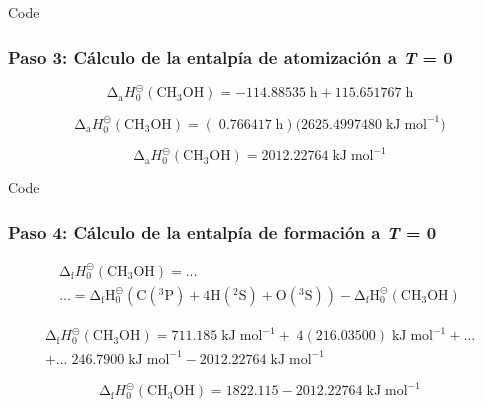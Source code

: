 \documentclass{beamer}
\begin{document}
\begin{frame}[fragile]{Code}
\frametitle{Paso 3: Cálculo de la entalpía de atomización a \textit{T} = 0}

\begin{equation}
	\mathrm{\Delta}_\mathrm{{a}} H^{\circleddash}_{0}\mathrm{(CH_3OH) = -114.88535\;\mathrm{h} + 115.651767\;\mathrm{h}}
\end{equation}

\begin{equation}
	\mathrm{\Delta}_\mathrm{{a}} H^{\circleddash}_{0}\mathrm{(CH_3OH) = (\;0.766417\;\mathrm{h})(2625.4997480\;\mathrm{kJ\;mol^{-1})}}
\label{eq:4.4}
\end{equation}

\begin{equation}
	\mathrm{\Delta}_\mathrm{{a}} H^{\circleddash}_{0}\mathrm{(CH_3OH) = 2012.22764\; \mathrm{kJ\;mol^{-1}}}
\label{eq:4.5}
\end{equation}
\end{frame}
\begin{frame}[fragile]{Code}
\frametitle{Paso 4: Cálculo de la entalpía de formación a \textit{T} = 0}

\begin{multline}
	\mathrm{\Delta}_\mathrm{{f}} H^{\circleddash}_{0}\mathrm{(CH_3OH)} =... \\ ...= \mathrm{\Delta_{f} H^{\circleddash}_{0}} \mathrm{(C(^{3}P) + 4H(^{2}S) + O(^{3}S))- \Delta_{f} H^{\circleddash}_{0} (CH_{3}OH)}
\label{eq:4.6}
\end{multline}

\begin{multline}
	\mathrm{\Delta}_\mathrm{{f}} H^{\circleddash}_{0}\mathrm{(CH_3OH)} = \mathrm{711.185}\;\mathrm{kJ\;mol^{-1}} +\;\mathrm{4(216.03500)}\mathrm{\;kJ\;mol^{-1}} +...\\
	+...\; \mathrm{246.7900}\;\mathrm{kJ\;mol^{-1}} - \mathrm{2012.22764}\; \mathrm{kJ\;mol^{-1}}
\label{eq:4.7}
\end{multline}

\begin{equation}
	\mathrm{\Delta}_\mathrm{{f}} H^{\circleddash}_{0}\mathrm{(CH_3OH) = 1822.115 - 2012.22764\; kJ\;mol^{-1}}
\end{equation}
\end{frame}
\end{document}
